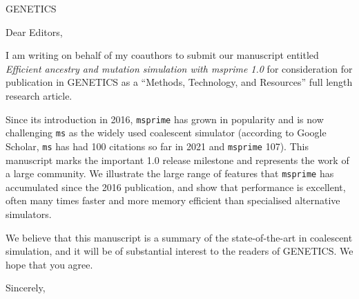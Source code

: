 \documentclass{letter}
\begin{document}
\begin{letter}{GENETICS}

\opening{Dear Editors,}

I am writing on behalf of my coauthors to submit our manuscript entitled
\emph{Efficient ancestry and mutation simulation with msprime 1.0}
for consideration for publication in GENETICS
as a ``Methods, Technology, and Resources'' full length research article.


Since its introduction in 2016, \texttt{msprime} has grown in popularity
and is now challenging \texttt{ms} as the widely used coalescent simulator
(according to Google Scholar, \texttt{ms} has had 100 citations so far
in 2021 and \texttt{msprime} 107). This manuscript marks the important
1.0 release milestone and represents the work
of a large community. We illustrate the large range of features
that \texttt{msprime} has accumulated since the 2016 publication,
and show that performance is excellent,
often many times faster and more memory efficient than specialised
alternative simulators.

We believe that this manuscript is a summary of the state-of-the-art
in coalescent simulation, and it will be of substantial
interest to the readers of GENETICS. We hope that you agree.

\closing{Sincerely,}

\end{letter}
\end{document}
